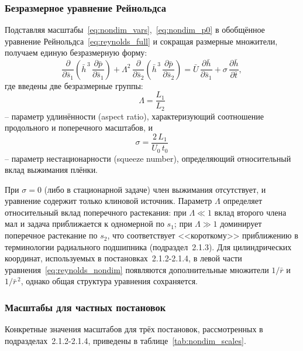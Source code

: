\subsubsection*{Безразмерное уравнение Рейнольдса}

Подставляя масштабы~\eqref{eq:nondim_vars},~\eqref{eq:nondim_p0} в обобщённое уравнение Рейнольдса~\eqref{eq:reynolds_full} и сокращая размерные множители, получаем единую безразмерную форму:
%
\begin{equation}
\frac{\partial}{\partial \bar{s}_1}\!\left(\bar{h}^{\,3}\,\frac{\partial \bar{p}}{\partial \bar{s}_1}\right)
+ \Lambda^2\,\frac{\partial}{\partial \bar{s}_2}\!\left(\bar{h}^{\,3}\,\frac{\partial \bar{p}}{\partial \bar{s}_2}\right)
= \bar{U}\,\frac{\partial \bar{h}}{\partial \bar{s}_1}
+ \sigma\,\frac{\partial \bar{h}}{\partial \bar{t}},
\label{eq:reynolds_nondim}
\end{equation}
%
где введены две безразмерные группы:
%
\begin{equation}
\Lambda = \frac{L_1}{L_2}
\label{eq:nondim_Lambda}
\end{equation}
%
-- параметр удлинённости (aspect ratio), характеризующий соотношение продольного и поперечного масштабов, и
%
\begin{equation}
\sigma = \frac{2\,L_1}{U_0\,t_0}
\label{eq:nondim_sigma}
\end{equation}
%
-- параметр нестационарности (squeeze number), определяющий относительный вклад выжимания плёнки.

При $\sigma = 0$ (либо в стационарной задаче) член выжимания отсутствует, и уравнение содержит только клиновой источник. Параметр $\Lambda$ определяет относительный вклад поперечного растекания: при $\Lambda \ll 1$ вклад второго члена мал и задача приближается к одномерной по $s_1$; при $\Lambda \gg 1$ доминирует поперечное растекание по $s_2$, что соответствует <<короткому>> приближению в терминологии радиального подшипника (подраздел~2.1.3). Для цилиндрических координат, используемых в постановках~2.1.2-2.1.4, в левой части уравнения~\eqref{eq:reynolds_nondim} появляются дополнительные множители $1/\bar{r}$ и $1/\bar{r}^{\,2}$, однако общая структура уравнения сохраняется.

\subsubsection*{Масштабы для частных постановок}

Конкретные значения масштабов для трёх постановок, рассмотренных в подразделах~2.1.2-2.1.4, приведены в таблице~\ref{tab:nondim_scales}.


